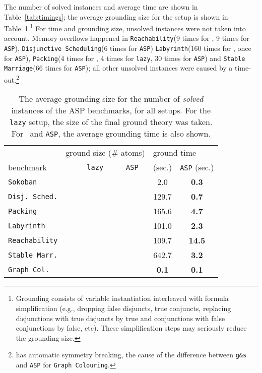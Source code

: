 \documentclass[11pt]{article}
\newcommand{\logicname}[1]{\text{\sc #1}\xspace}
\newcommand{\idp}{\logicname{IDP}}
\theoremstyle{plain}
\theoremstyle{definition}
\theoremstyle{example_basic}
\theoremstyle{example_contd}
\theoremstyle{plain}
\newcommand{\reach}				{\texttt{Reachability}\xspace}
\newcommand{\stablemarriage}	{\texttt{Stable Marriage}\xspace}
\newcommand{\colouring}			{\texttt{Graph Colouring}\xspace}
\newcommand{\packing}			{\texttt{Packing}\xspace}
\newcommand{\disjsched}			{\texttt{Disjunctive Scheduling}\xspace}
\newcommand{\labyrinth}			{\texttt{Labyrinth}\xspace}
\newcommand{\reachs}			{\texttt{Reachability}\xspace}
\newcommand{\stablemarriages}	{\texttt{Stable Marr.}\xspace}
\newcommand{\colourings}		{\texttt{Graph Col.}\xspace}
\newcommand{\packings}			{\texttt{Packing}\xspace}
\newcommand{\sokobans}			{\texttt{Sokoban}\xspace}
\newcommand{\disjscheds}		{\texttt{Disj. Sched.}\xspace}
\newcommand{\labyrinths}		{\texttt{Labyrinth}\xspace}
\newcommand{\tbf}[1]{\textbf{#1}}
\newcommand{\change}[1]{#1}
\begin{document}
The number of solved instances and average time are shown in Table~\ref{tab:timings}; the average grounding size for the \idp setup is shown in Table~\ref{tab:groundings}.\footnote{\change{Grounding consists of variable instantiation interleaved with formula simplification (e.g., dropping false disjuncts, true conjuncts, replacing disjunctions with true disjuncts by true and conjunctions with false conjunctions by false, etc). These simplification steps may seriously reduce the grounding size.}
} \change{For time and grounding size, unsolved instances were not taken into account. Memory overflows happened in \reach (9 times for \gs, 9 times for \texttt{ASP}), \disjsched (6 times for \texttt{ASP}) \labyrinth (160 times for \gs, once for \texttt{ASP}), \packing (4 times for \gs, 4 times for \texttt{lazy}, 30 times for \texttt{ASP}) and \stablemarriage (66 times for \texttt{ASP}); all other unsolved instances were caused by a time-out.}\footnote{\idp has automatic symmetry breaking, the cause of the difference between \texttt{g\&s} and \texttt{ASP} for \colouring.}

\begin{table}
\centering
\begin{tabularx}{0.95\textwidth}{l||c|c|c||c|c}
\multicolumn{1}{l||}{} 	& \multicolumn{3}{c||}{ground size (\# atoms)} & \multicolumn{2}{l}{ground time}\\
benchmark 				& \gs & \texttt{lazy} & \texttt{ASP} & \gs (sec.) & \texttt{ASP} (sec.)\\
\hline
\hline
\sokobans			&	& &			& 2.0	&\tbf{0.3}\\	
\disjscheds			&			& &	& 129.7	&\tbf{0.7}\\
\packings			&			& &	& 165.6	&\tbf{4.7}\\
\labyrinths			&			& &	& 101.0	&\tbf{2.3}\\
\reachs				&			& &	& 109.7	&\tbf{14.5}\\
\stablemarriages	&			& &	& 642.7	&\tbf{3.2}\\
\colourings			&	& &		& \tbf{0.1}	&\tbf{0.1}
\end{tabularx}
\caption{\change{The average grounding size for the number of \emph{solved} instances of the ASP benchmarks, for all setups. For the \texttt{lazy} setup, the size of the final ground theory was taken. For \gs\ and \texttt{ASP}, the average grounding time is also shown.}}
\label{tab:groundings}
\end{table}
\end{document}
